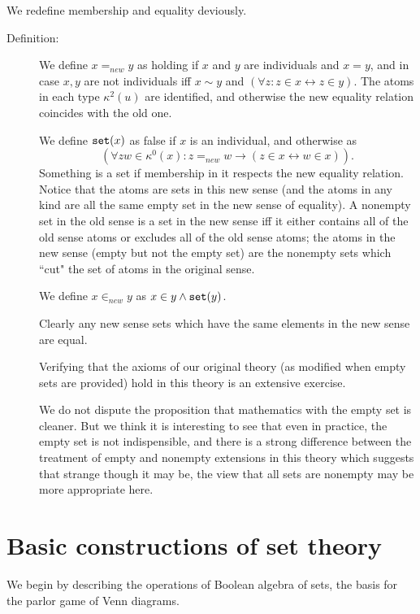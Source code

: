 \documentclass[12pt]{article}
\begin{document}
We redefine membership and equality deviously.

\begin{description}

\item[Definition:]  We define $x=_{new}y$ as holding if $x$ and $y$ are individuals and $x=y$,
and in case $x,  y$ are not individuals  iff $x \sim y$ and $(\forall z:z \in x \leftrightarrow z\in y)$.  The atoms in each type $\kappa^2(u)$ are
 identified, and otherwise the new equality relation coincides with the old one.

We define ${\tt set}(x)$ as false if $x$ is an individual, and otherwise as $$(\forall zw \in \kappa^0(x):z=_{new}w \rightarrow (z \in x \leftrightarrow w \in x)).$$ Something is a set if membership in it respects the new equality relation.
Notice that the atoms are sets in this new sense (and the atoms in any kind are all the same empty set in the new sense of equality).  A nonempty set in the old sense is a set in the new sense iff it either contains all of the old sense atoms or excludes all of the old sense atoms; the atoms in the new sense (empty but not the empty set) are the nonempty sets which ``cut" the set of atoms in the original sense.

We define $x \in_{new}y$ as $x \in y \wedge {\tt set}(y)$.

Clearly any new sense sets which have the same elements in the new sense are equal.

Verifying that the axioms of our original theory (as modified when empty sets are provided) hold in this theory is an extensive exercise.

We do not dispute the proposition that mathematics with the empty set is cleaner.  But we think it is interesting to see that even in practice, the empty set is not indispensible, and there is a strong difference between the treatment of empty and nonempty extensions in this theory which suggests that strange though it may be, the view that all sets are nonempty may be more appropriate here.



\end{description}

\newpage

\section{Basic constructions of set theory}

We begin by describing the operations of Boolean algebra of sets, the basis for the parlor game of Venn diagrams.
\end{document}
